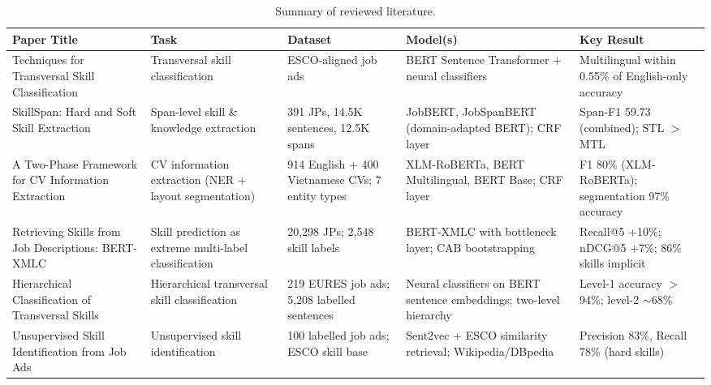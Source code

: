 \documentclass[]{ceurart}
\begin{document}
\begin{table}[ht]
\centering
\caption{Summary of reviewed literature.}
\label{tab:summary}
\small
\renewcommand{\arraystretch}{1.25}
\begin{tabular}{@{}p{3.5cm}p{2.5cm}p{2.8cm}p{3.0cm}p{3.2cm}@{}}
\toprule
\textbf{Paper Title} & \textbf{Task} & \textbf{Dataset} & \textbf{Model(s)} & \textbf{Key Result} \\
\midrule
Techniques for Transversal Skill Classification~\cite{Gavrilescu2025}
  & Transversal skill classification
  & ESCO-aligned job ads
  & BERT Sentence Transformer + neural classifiers
  & Multilingual within 0.55\% of English-only accuracy \\
\addlinespace
SkillSpan: Hard and Soft Skill Extraction~\cite{Zhang2022}
  & Span-level skill \& knowledge extraction
  & 391 JPs, 14.5K sentences, 12.5K spans
  & JobBERT, JobSpanBERT (domain-adapted BERT); CRF layer
  & Span-F1 59.73 (combined); STL $>$ MTL \\
\addlinespace
A Two-Phase Framework for CV Information Extraction~\cite{Ngo2020CVExtraction}
  & CV information extraction (NER + layout segmentation)
  & 914 English + 400 Vietnamese CVs; 7 entity types
  & XLM-RoBERTa, BERT Multilingual, BERT Base; CRF layer
  & F1 80\% (XLM-RoBERTa); segmentation 97\% accuracy \\
\addlinespace
Retrieving Skills from Job Descriptions: BERT-XMLC~\cite{Bhola2020XMLC}
  & Skill prediction as extreme multi-label classification
  & 20,298 JPs; 2,548 skill labels
  & BERT-XMLC with bottleneck layer; CAB bootstrapping
  & Recall@5 +10\%; nDCG@5 +7\%; 86\% skills implicit \\
\addlinespace
Hierarchical Classification of Transversal Skills~\cite{Leon2024Hierarchical}
  & Hierarchical transversal skill classification
  & 219 EURES job ads; 5,208 labelled sentences
  & Neural classifiers on BERT sentence embeddings; two-level hierarchy
  & Level-1 accuracy $>$94\%; level-2 $\sim$68\% \\

\addlinespace
Unsupervised Skill Identification from Job Ads~\cite{Khaouja2021Unsupervised}
  & Unsupervised skill identification
  & 100 labelled job ads; ESCO skill base
  & Sent2vec + ESCO similarity retrieval; Wikipedia/DBpedia
  & Precision 83\%, Recall 78\% (hard skills) \\


\end{tabular}
\end{table}
\end{document}

